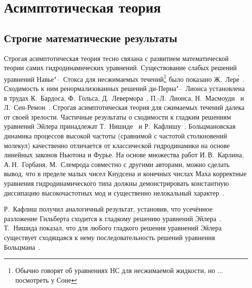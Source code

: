 \section{Асимптотическая теория} \label{sect:asymptotic}

\subsection{Строгие математические результаты}

Строгая асимптотическая теория тесно связана с развитием математической теории самих гидродинамических уравнений.
Существование слабых решений уравнений Навье"--~Стокса для несжимаемых течений\footnote{
Обычно говорят об уравнениях НС для несжимаемой жидкости, но ... посмотреть у Соне
} было показано Ж.~Лер\'{е}~\autocite{Leray1934}.
Сходимость к ним ренормализованных решений ди-Перна"--~Лионса установлена в трудах
К.~Бардоса, Ф.~Гольса, Д.~Левермора~\autocite{Bardos1993},
П.-Л.~Лионса, Н.~Масмоуди~\autocite{Masmoudi2001} и Л.~Сен-Ремон~\autocite{Golse2004}.
Строгая асимптотическая теория для сжимаемых течений далека от своей зрелости.
Частичные результаты о сходимости к гладким решениям уравнений Эйлера принадлежат
Т.~Нишиде~\autocite{Nishida1978} и Р.~Кафлишу~\autocite{Caflisch1980limit}.
Больцмановская динамика процессов высокой частоты (сравнимой с частотой столкновений молекул)
качественно отличается от классической гидродинамики на основе линейных законов Ньютона и Фурье.
На основе множества работ И.\,В.~Карлина, А.\,Н.~Горбаня, М.~Слемрода совместно с другими авторами,
можно сделать вывод, что в пределе малых чисел Кнудсена и конечных числах Маха корректные уравнения
гидродинамического типа должны демонстрировать константную диссипацию высокочастотных мод
и существенно нелокальный характер~\autocite{Gorban2014}.



Р.~Кафлиш получил аналогичный результат, установив, что усечённое разложение Гильберта
сходится к гладкому решению уравнений Эйлера~\cite{Caflisch1980limit}.
Т.~Нишида показал, что для любого гладкого решения уравнений Эйлера существует сходящаяся к нему
последовательность решений уравнения Больцмана~\cite{Nishida1978}.


